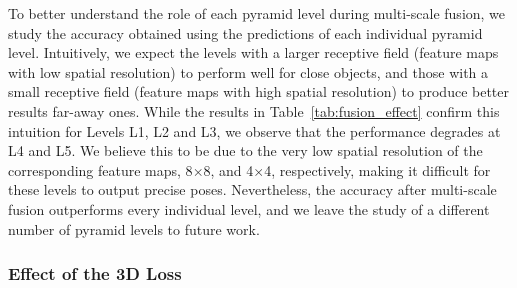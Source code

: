 To better understand the role of each pyramid level during multi-scale fusion, we study the accuracy obtained using the predictions of each individual pyramid level.
Intuitively, we expect the levels with a larger receptive field (feature maps with low spatial resolution) to perform well for close objects, and those with a small receptive field (feature maps with high spatial resolution) to produce better results far-away ones. While the results in Table~\ref{tab:fusion_effect} confirm this intuition for Levels L1, L2 and L3, we observe that the performance degrades at L4 and L5. We believe this to be due to the very low spatial resolution of the corresponding feature maps, 8$\times$8, and 4$\times$4, respectively, making it difficult for these levels to output precise poses. Nevertheless, the accuracy after multi-scale fusion outperforms every individual level, and we leave the study of a different number of pyramid levels to future work.


\subsubsection{Effect of the 3D Loss}




